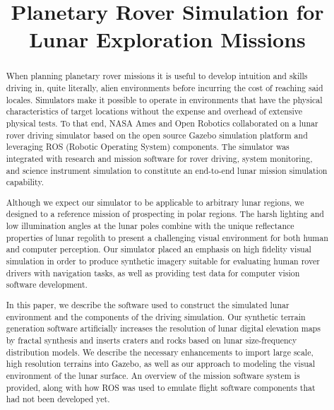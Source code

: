 \documentclass[twocolumn,letterpaper]{IEEEAerospaceCLS}  %
\begin{document}
\title{Planetary Rover Simulation for Lunar Exploration Missions}

\author{%
}

\maketitle

\thispagestyle{plain}
\pagestyle{plain}

\maketitle

\thispagestyle{plain}
\pagestyle{plain}

\begin{abstract}

When planning planetary rover missions it is useful to develop intuition and skills driving in, quite literally, alien environments before incurring the cost of reaching said locales. 
Simulators make it possible to operate in environments that have the physical characteristics of target locations without the expense and overhead of extensive physical tests. 
To that end, NASA Ames and Open Robotics collaborated on a lunar rover driving simulator based on the open source Gazebo simulation platform and leveraging ROS (Robotic Operating System) components. 
The simulator was integrated with research and mission software for rover driving, system monitoring, and science instrument simulation to constitute an end-to-end lunar mission simulation capability.

Although we expect our simulator to be applicable to arbitrary lunar regions, we designed to a reference mission of prospecting in polar regions. 
The harsh lighting and low illumination angles at the lunar poles combine with the unique reflectance properties of lunar regolith to present a challenging visual environment for both human and computer perception. 
Our simulator placed an emphasis on high fidelity visual simulation in order to produce synthetic imagery suitable for evaluating human rover drivers with navigation tasks, as well as providing test data for computer vision software development.

In this paper, we describe the software used to construct the simulated lunar environment and the components of the driving simulation. 
Our synthetic terrain generation software artificially increases the resolution of lunar digital elevation maps by fractal synthesis and inserts craters and rocks based on lunar size-frequency distribution models. 
We describe the necessary enhancements to import large scale, high resolution terrains into Gazebo, as well as our approach to modeling the visual environment of the lunar surface. 
An overview of the mission software system is provided, along with how ROS was used to emulate flight software components that had not been developed yet.


\end{abstract}
\end{document}

